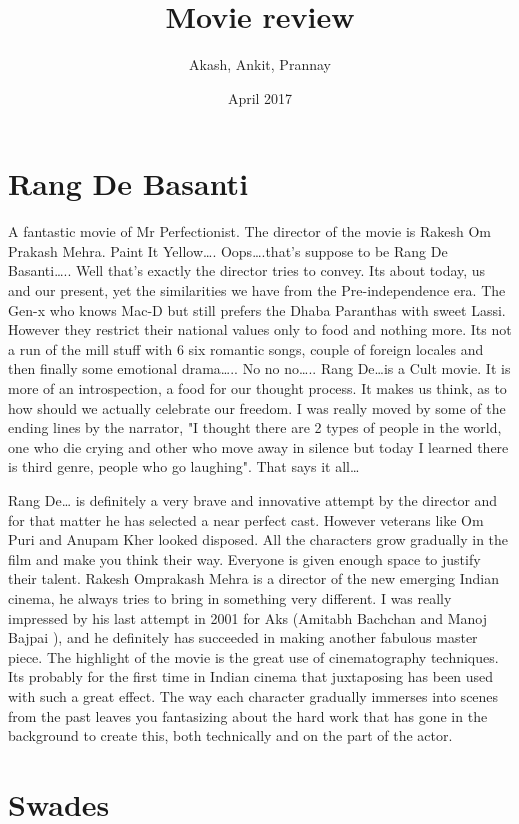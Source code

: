 \documentclass{article}
\title{Movie review}
\author{Akash, Ankit, Prannay}
\date{April 2017}
\begin{document}
\maketitle

\section*{Rang De Basanti}
A fantastic movie of Mr Perfectionist.
The director of the movie is Rakesh Om Prakash Mehra.
Paint It Yellow…. Oops….that's suppose to be Rang De Basanti….. Well that's exactly the director tries to convey. Its about today, us and our present, yet the similarities we have from the Pre-independence era. The Gen-x who knows Mac-D but still prefers the Dhaba Paranthas with sweet Lassi. However they restrict their national values only to food and nothing more. Its not a run of the mill stuff with 6 six romantic songs, couple of foreign locales and then finally some emotional drama….. No no no….. Rang De…is a Cult movie. It is more of an introspection, a food for our thought process. It makes us think, as to how should we actually celebrate our freedom. I was really moved by some of the ending lines by the narrator, "I thought there are 2 types of people in the world, one who die crying and other who move away in silence but today I learned there is third genre, people who go laughing". That says it all… 

Rang De… is definitely a very brave and innovative attempt by the director and for that matter he has selected a near perfect cast. However veterans like Om Puri and Anupam Kher looked disposed. All the characters grow gradually in the film and make you think their way. Everyone is given enough space to justify their talent. Rakesh Omprakash Mehra is a director of the new emerging Indian cinema, he always tries to bring in something very different. I was really impressed by his last attempt in 2001 for Aks (Amitabh Bachchan and Manoj Bajpai ), and he definitely has succeeded in making another fabulous master piece. The highlight of the movie is the great use of cinematography techniques. Its probably for the first time in Indian cinema that juxtaposing has been used with such a great effect. The way each character gradually immerses into scenes from the past leaves you fantasizing about the hard work that has gone in the background to create this, both technically and on the part of the actor.


\section*{Swades}
\end{document}
